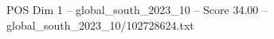 \begin{textsample}{POS Dim 1 – global\_south\_2023\_10 – Score 34.00 – global\_south\_2023\_10/102728624.txt}
\end{textsample}

